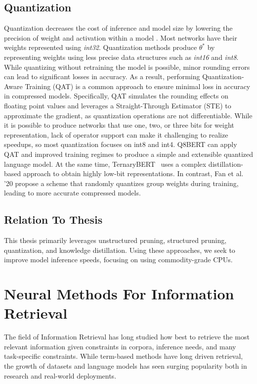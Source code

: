 \subsection{Quantization}
Quantization decreases the cost of inference and model size by lowering the precision of weight and activation within a model \cite{Courbariaux2016BinarizedNN}. Most networks have their weights represented using \textit{int32}. Quantization methods produce $\theta^*$ by representing weights using less precise data structures such as \textit{int16} and \textit{int8}. While quantizing without retraining the model is possible, minor rounding errors can lead to significant losses in accuracy. As a result, performing  Quantization-Aware Training (QAT) is a common approach to ensure minimal loss in accuracy in compressed models. Specifically, QAT simulates the rounding effects on floating point values and leverages a Straight-Through Estimator (STE) to approximate the gradient, as quantization operations are not differentiable. While it is possible to produce networks that use one, two, or three bits for weight representation, lack of operator support can make it challenging to realize speedups, so most quantization focuses on int8 and int4. Q8BERT \cite{Zafrir2019Q8BERTQ8} can apply QAT and improved training regimes to produce a simple and extensible quantized language model. At the same time, TernaryBERT~\cite{zhang2020ternarybert} uses a complex distillation-based approach to obtain highly low-bit representations. In contrast, Fan et al. '20 \cite{fan2020training} propose a scheme that randomly quantizes group weights during training, leading to more accurate compressed models.
\subsection{Relation To Thesis}
This thesis primarily leverages unstructured pruning, structured pruning, quantization, and knowledge distillation. Using these approaches, we seek to improve model inference speeds, focusing on using commodity-grade CPUs. 
\section{Neural Methods For Information Retrieval}
The field of Information Retrieval has long studied how best to retrieve the most relevant information given constraints in corpora, inference needs, and many task-specific constraints. While term-based methods have long driven retrieval, the growth of datasets and language models has seen surging popularity both in research and real-world deployments.  
